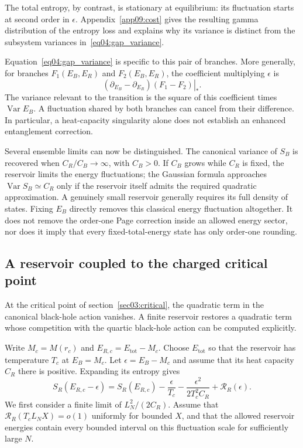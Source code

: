 \documentclass[11pt,letterpaper]{article}
\DeclareMathOperator{\Var}{Var}
\theoremstyle{plain}
\theoremstyle{definition}
\theoremstyle{remark}
\begin{document}
The total entropy, by contrast, is stationary at equilibrium: its fluctuation starts at second order in $\epsilon$. Appendix~\ref{app09:cost} gives the resulting gamma distribution of the entropy loss and explains why its variance is distinct from the subsystem variances in~\eqref{eq04:gap_variance}.

Equation~\eqref{eq04:gap_variance} is specific to this pair of branches. More generally, for branches $F_1(E_B,E_R)$ and $F_2(E_B,E_R)$, the coefficient multiplying $\epsilon$ is
\begin{equation}
 \left.(\partial_{E_B}-\partial_{E_R})(F_1-F_2)\right|_*.
 \label{eq04:general_branch_derivative}
\end{equation}
The variance relevant to the transition is the square of this coefficient times $\Var E_B$. A fluctuation shared by both branches can cancel from their difference. In particular, a heat-capacity singularity alone does not establish an enhanced entanglement correction.

Several ensemble limits can now be distinguished. The canonical variance of $S_B$ is recovered when $C_R/C_B\to\infty$, with $C_B>0$. If $C_B$ grows while $C_R$ is fixed, the reservoir limits the energy fluctuations; the Gaussian formula approaches $\Var S_B\simeq C_R$ only if the reservoir itself admits the required quadratic approximation. A genuinely small reservoir generally requires its full density of states. Fixing $E_B$ directly removes this classical energy fluctuation altogether. It does not remove the order-one Page correction inside an allowed energy sector, nor does it imply that every fixed-total-energy state has only order-one rounding.

\subsection{A reservoir coupled to the charged critical point}

At the critical point of section~\ref{sec03:critical}, the quadratic term in the canonical black-hole action vanishes. A finite reservoir restores a quadratic term whose competition with the quartic black-hole action can be computed explicitly.

Write $M_c=M(r_c)$ and $E_{R,c}=E_{\mathrm{tot}}-M_c$. Choose $E_{\mathrm{tot}}$ so that the reservoir has temperature $T_c$ at $E_B=M_c$. Let $\epsilon=E_B-M_c$ and assume that its heat capacity $C_R$ there is positive. Expanding its entropy gives
\begin{equation}
 S_R(E_{R,c}-\epsilon)
 =S_R(E_{R,c})-\frac{\epsilon}{T_c}
 -\frac{\epsilon^2}{2T_c^2 C_R}+\mathcal R_R(\epsilon).
 \label{eq04:reservoir_expansion}
\end{equation}
We first consider a finite limit of $L_N^2/(2C_R)$. Assume that $\mathcal R_R(T_cL_N X)=o(1)$ uniformly for bounded $X$, and that the allowed reservoir energies contain every bounded interval on this fluctuation scale for sufficiently large $N$.
\end{document}
